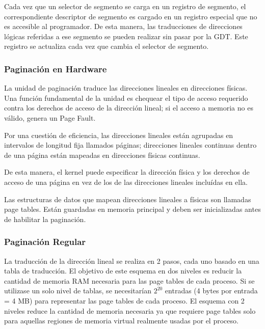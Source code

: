 Cada vez que un selector de segmento se carga en un registro de segmento, el correspondiente descriptor de segmento es cargado en un registro
especial que no es accesible al programador. De esta manera, las traducciones de direcciones l\'ogicas referidas a ese segmento se pueden realizar sin pasar
por la GDT. Este registro se actualiza cada vez que cambia el selector de segmento.


\subsubsection{Paginaci\'on en Hardware}

La unidad de paginaci\'on traduce las direcciones lineales en direcciones f\'isicas. Una funci\'on fundamental de la unidad es chequear el tipo
de acceso requerido contra los derechos de acceso de la direcci\'on lineal; si el acceso a memoria no es v\'alido, genera un Page Fault.

Por una cuesti\'on de eficiencia, las direcciones lineales est\'an agrupadas en intervalos de longitud fija llamados p\'aginas; direcciones lineales
continuas dentro de una p\'agina est\'an mapeadas en direcciones f\'isicas continuas.

De esta manera, el kernel puede especificar la direcci\'on f\'isica y los derechos de acceso de una p\'agina en vez de los de las direcciones lineales
inclu\'idas en ella.

Las estructuras de datos que mapean direcciones lineales a f\'isicas son llamadas page tables. Est\'an guardadas en memoria principal y deben ser
inicializadas antes de habilitar la paginaci\'on.

\subsubsection{Paginaci\'on Regular}

La traducci\'on de la direcci\'on lineal se realiza en 2 pasos, cada uno basado en una tabla de traducci\'on. El objetivo de este esquema en dos
niveles es reducir la cantidad de memoria RAM necesaria para las page tables de cada proceso. Si se utilizase un solo nivel de tablas, se
necesitar\'ian $2^{20}$ entradas (4 bytes por entrada = 4 MB) para representar las page tables de cada proceso. El esquema con 2 niveles reduce la
cantidad de memoria necesaria ya que requiere page tables solo para aquellas regiones de memoria virtual realmente usadas por el proceso.


